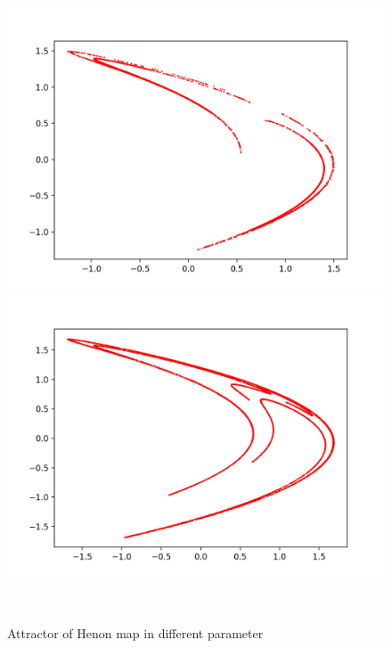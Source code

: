 \documentclass[12pt]{article}
\theoremstyle{plain}
\begin{document}
\begin{figure}[H]
\begin{minipage}[c][0.32\width]{0.32\textwidth}
   \includegraphics[width=\textwidth]{figure/section2/Henon-attractor-1*045-0*4.png}
\end{minipage}
\begin{minipage}[c][0.32\width]{0.32\textwidth}
   \centering
   \includegraphics[width=\textwidth]{figure/section2/Henon-attractor-1*2-0*4.png}
\end{minipage}
\\[4ex]\caption{Attractor of Henon map in different parameter}\label{attractor-Henon-map}
\end{figure}
\end{document}
